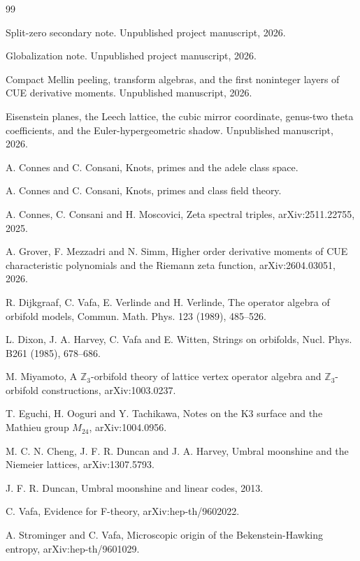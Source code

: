 \documentclass[11pt]{amsart}
\newcommand{\ZZ}{\mathbb Z}
\begin{document}
\begin{thebibliography}{99}

Split-zero secondary note.  Unpublished project manuscript, 2026.

Globalization note.  Unpublished project manuscript, 2026.

Compact Mellin peeling, transform algebras, and the first noninteger layers of CUE derivative moments.  Unpublished manuscript, 2026.

Eisenstein planes, the Leech lattice, the cubic mirror coordinate, genus-two theta coefficients, and the Euler-hypergeometric shadow.  Unpublished manuscript, 2026.

A. Connes and C. Consani, Knots, primes and the adele class space.

A. Connes and C. Consani, Knots, primes and class field theory.

A. Connes, C. Consani and H. Moscovici, Zeta spectral triples, arXiv:2511.22755, 2025.

A. Grover, F. Mezzadri and N. Simm, Higher order derivative moments of CUE characteristic polynomials and the Riemann zeta function, arXiv:2604.03051, 2026.

R. Dijkgraaf, C. Vafa, E. Verlinde and H. Verlinde, The operator algebra of orbifold models, Commun. Math. Phys. 123 (1989), 485--526.

L. Dixon, J. A. Harvey, C. Vafa and E. Witten, Strings on orbifolds, Nucl. Phys. B261 (1985), 678--686.

M. Miyamoto, A $\ZZ_3$-orbifold theory of lattice vertex operator algebra and $\ZZ_3$-orbifold constructions, arXiv:1003.0237.

T. Eguchi, H. Ooguri and Y. Tachikawa, Notes on the K3 surface and the Mathieu group $M_{24}$, arXiv:1004.0956.

M. C. N. Cheng, J. F. R. Duncan and J. A. Harvey, Umbral moonshine and the Niemeier lattices, arXiv:1307.5793.

J. F. R. Duncan, Umbral moonshine and linear codes, 2013.

C. Vafa, Evidence for F-theory, arXiv:hep-th/9602022.

A. Strominger and C. Vafa, Microscopic origin of the Bekenstein-Hawking entropy, arXiv:hep-th/9601029.


\end{thebibliography}
\end{document}
